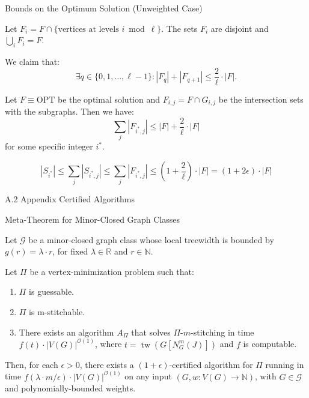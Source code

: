\documentclass{beamer}
\newcommand{\tw}{\operatorname{tw}}
\begin{document}
\begin{frame}{Bounds on the Optimum Solution (Unweighted Case)}
    \footnotesize
    \begin{lemma}
        \label{lemma-two}

        Let $F_i = F \cap \{\text{vertices at levels } i \bmod \ell\}$. 
        The sets $F_i$ are disjoint and $\bigcup_i F_i = F$.

        We claim that:
        \[
            \exists q \in \{0, 1, \dots, \ell-1\} : |F_q| + |F_{q+1}| \leq \frac{2}{\ell} \cdot |F| \text{.}
        \]
    \end{lemma}

    \begin{lemma}
    \label{lemma-three}
    Let \( F \equiv \text{OPT} \) be the optimal solution and \( F_{i,j} = F \cap G_{i,j} \) be the intersection 
    sets with the subgraphs. Then we have: 
    \[
    \sum_j |F_{i^*, j}| \leq |F| + \frac{2}{\ell} \cdot |F|
    \]
    for some specific integer \( i^* \).
    \end{lemma}

    \[
    |S_{i^*}| \leq \sum\limits_{j} |S_{i^*, j}| \leq \sum\limits_{j} |F_{i^*, j}| \leq (1 + \frac{2}{\ell}) \cdot |F| = (1 + 2\epsilon)\cdot\left|F\right|
    \]

\end{frame}

\begin{frame}{A.2}
  \hypertarget{appendix-a2}{}
  \centering
  \Huge Appendix Certified Algorithms
\end{frame}

\begin{frame}{Meta-Theorem for Minor-Closed Graph Classes}

\begin{theorem}
Let $\mathcal{G}$ be a minor-closed graph class whose local treewidth is bounded by $g(r) = \lambda \cdot r$, for fixed $\lambda \in \mathbb{R}$ and $r \in \mathbb{N}$.

Let $\Pi$ be a vertex-minimization problem such that:
\begin{enumerate}
    \item $\Pi$ is guessable.
    \item $\Pi$ is m-stitchable.
    \item There exists an algorithm $A_\Pi$ that solves $\Pi$-$m$-stitching in time 
    $f(t) \cdot |V(G)|^{\mathcal{O}(1)}$, where $t = \tw(G[N_G^m(J)])$ and $f$ is computable.
\end{enumerate}

Then, for each $\epsilon > 0$, there exists a $(1 + \epsilon)$-certified algorithm for $\Pi$ 
running in time $f(\lambda \cdot m / \epsilon) \cdot |V(G)|^{\mathcal{O}(1)}$ on any input 
$(G, w : V(G) \to \mathbb{N})$, with $G \in \mathcal{G}$ and polynomially-bounded weights.
\end{theorem}

\end{frame}
\end{document}
